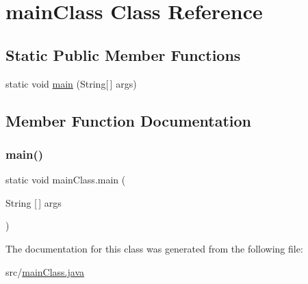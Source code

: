 \hypertarget{classmain_class}{}\section{main\+Class Class Reference}
\label{classmain_class}
\subsection*{Static Public Member Functions}
\begin{DoxyCompactItemize}
\item 
static void \hyperlink{classmain_class_a0b4ecc5e71b50c684de72b0b691a14d0}{main} (String\mbox{[}$\,$\mbox{]} args)
\end{DoxyCompactItemize}


\subsection{Member Function Documentation}
\hypertarget{classmain_class_a0b4ecc5e71b50c684de72b0b691a14d0}{}\label{classmain_class_a0b4ecc5e71b50c684de72b0b691a14d0} 
\subsubsection{\texorpdfstring{main()}{main()}}
{\footnotesize\ttfamily static void main\+Class.\+main (\begin{DoxyParamCaption}\item[{String \mbox{[}$\,$\mbox{]}}]{args }\end{DoxyParamCaption})\hspace{0.3cm}{\ttfamily [static]}}



The documentation for this class was generated from the following file\+:\begin{DoxyCompactItemize}
\item 
src/\hyperlink{main_class_8java}{main\+Class.\+java}\end{DoxyCompactItemize}
